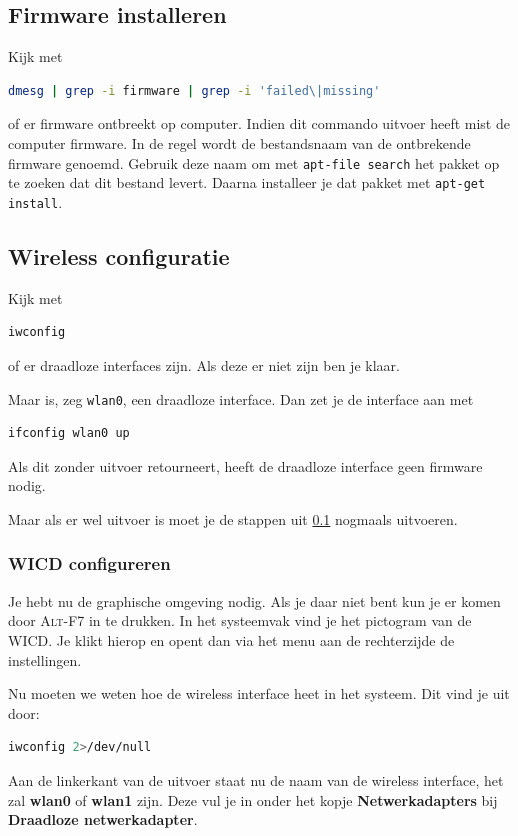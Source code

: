 \documentclass[12pt,a4paper]{article}
\begin{document}
\subsection{Firmware installeren}
\label{ssec:Firmware}
Kijk met 
\begin{lstlisting}[language=bash]
dmesg | grep -i firmware | grep -i 'failed\|missing'
\end{lstlisting}
of er firmware ontbreekt op computer.
Indien dit commando uitvoer heeft mist de computer firmware. In de regel wordt de bestandsnaam van de ontbrekende firmware genoemd. Gebruik deze naam om met \texttt{apt-file search} het pakket op te zoeken dat dit bestand levert. Daarna installeer je dat pakket met \texttt{apt-get install}.

\subsection{Wireless configuratie}
Kijk met 
\begin{lstlisting}[language=bash]
iwconfig
\end{lstlisting}
of er draadloze interfaces zijn. Als deze er niet zijn ben je klaar. 

Maar is, zeg \texttt{wlan0}, een draadloze interface. Dan zet je de interface aan met 
\begin{lstlisting}[language=bash]
ifconfig wlan0 up
\end{lstlisting}
Als dit zonder uitvoer retourneert, heeft de draadloze interface geen firmware nodig.

Maar als er wel uitvoer is moet je de stappen uit \ref{ssec:Firmware} nogmaals uitvoeren.
\subsubsection{WICD configureren}
Je hebt nu de graphische omgeving nodig. Als je daar niet bent kun je er komen door \textsc{Alt-F7} in te drukken.
In het systeemvak vind je het pictogram van de WICD. Je klikt hierop en opent dan via het menu aan de rechterzijde de instellingen. 

Nu moeten we weten hoe de wireless interface heet in het systeem. Dit vind je uit door:
\begin{lstlisting}[language=bash]
iwconfig 2>/dev/null
\end{lstlisting}
Aan de linkerkant van de uitvoer staat nu de naam van de wireless interface, het zal \textbf{wlan0} of  \textbf{wlan1} zijn. Deze vul je in onder het kopje \textbf{Netwerkadapters} bij \textbf{Draadloze netwerkadapter}.
\end{document}
